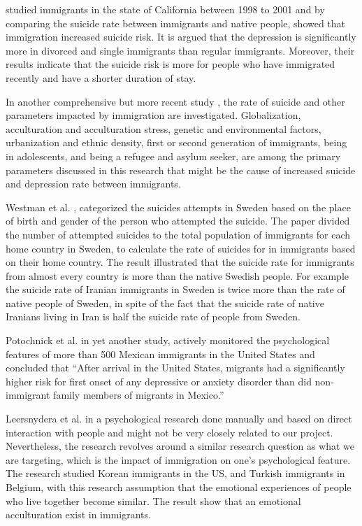 \documentclass{article}
\begin{document}
\cite{ref2} studied immigrants in the state of California between 1998 to 2001 and by comparing the suicide rate between immigrants and native people, showed that immigration increased suicide risk. It is argued that the depression is significantly more in divorced and single immigrants than regular immigrants. Moreover, their results indicate that the suicide risk is more for people who have immigrated recently and have a shorter duration of stay. 

In another comprehensive but more recent study \cite{ref4}, the rate of suicide and other parameters impacted by immigration are investigated. Globalization, acculturation and acculturation stress, genetic and environmental factors, urbanization and ethnic density, first or second generation of immigrants, being in adolescents, and being a refugee and asylum seeker, are among the primary parameters discussed in this research that might be the cause of increased suicide and depression rate between immigrants.

Westman et al. \cite{ref5}, categorized the suicides attempts in Sweden based on the place of birth and gender of the person who attempted the suicide. The paper divided the number of attempted suicides to the total population of immigrants for each home country in Sweden, to calculate the rate of suicides for in immigrants based on their home country. The result illustrated that the suicide rate for immigrants from almost every country is more than the native Swedish people. For example the suicide rate of Iranian immigrants in Sweden is twice more than the rate of native people of Sweden, in spite of the fact that the suicide rate of native Iranians living in Iran is half the suicide rate of people from Sweden.

Potochnick et al. \cite{ref6} in yet another study, actively monitored the psychological features of more than 500 Mexican immigrants in the United States and concluded that “After arrival in the United States, migrants had a significantly higher risk for first onset of any depressive or anxiety disorder than did non-immigrant family members of migrants in Mexico.”

Leersnydera et al. \cite{ref16} in a psychological research done manually and based on direct interaction with people and might not be very closely related to our project. Nevertheless, the research revolves around a similar research question as what we are targeting, which is the impact of immigration on one’s psychological feature. The research studied Korean immigrants in the US, and Turkish immigrants in Belgium, with this research assumption that the emotional experiences of people who live together become similar. The result show that an emotional acculturation exist in immigrants.
\end{document}

